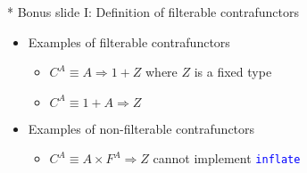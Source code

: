 \documentclass[english]{beamer}
\begin{document}
\begin{frame}{{*} Bonus slide I: Definition of filterable contrafunctors}
\begin{itemize}
\begin{itemize}
\item 2 laws (identity, contracomposition) for \texttt{\textcolor{blue}{\footnotesize{}contrafmapOpt}} 
\begin{itemize}
\item as before, \texttt{\textcolor{blue}{\footnotesize{}contrafmapOpt}}
is a ``twisted'' version of \texttt{\textcolor{blue}{\footnotesize{}contrafmap}} 
\end{itemize}
\end{itemize}
\item Examples of filterable contrafunctors
\begin{itemize}
\item $C^{A}\equiv A\Rightarrow1+Z$ where $Z$ is a fixed type
\item $C^{A}\equiv1+A\Rightarrow Z$
\end{itemize}
\item Examples of non-filterable contrafunctors
\begin{itemize}
\item $C^{A}\equiv A\times F^{A}\Rightarrow Z$ \textendash{} cannot implement
\texttt{\textcolor{blue}{\footnotesize{}inflate}} 
\end{itemize}
\end{itemize}
\end{frame}
\end{document}
